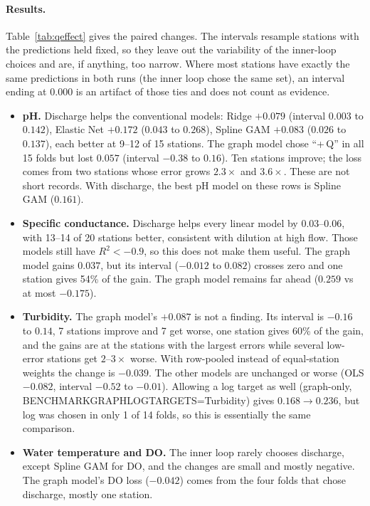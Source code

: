 \documentclass[11pt]{article}
\newcommand{\codeus}{\textunderscore\allowbreak}
\newcommand{\code}[1]{{\ttfamily\let\_\codeus #1}}
\begin{document}
\paragraph{Results.} Table~\ref{tab:qeffect} gives the paired changes. The intervals resample
stations with the predictions held fixed, so they leave out the variability of the inner-loop
choices and are, if anything, too narrow. Where most stations have exactly the same predictions in
both runs (the inner loop chose the same set), an interval ending at $0.000$ is an artifact of those
ties and does not count as evidence.
\begin{itemize}
  \item \textbf{pH.} Discharge helps the conventional models: Ridge $+0.079$ (interval $0.003$ to
        $0.142$), Elastic Net $+0.172$ ($0.043$ to $0.268$), Spline GAM $+0.083$ ($0.026$ to
        $0.137$), each better at 9--12 of 15 stations. The graph model chose ``+\,Q'' in all 15
        folds but lost $0.057$ (interval $-0.38$ to $0.16$). Ten stations improve; the loss comes
        from two stations whose error grows $2.3\times$ and $3.6\times$. These are not short
        records. With discharge, the best pH model on these rows is Spline GAM ($0.161$).
  \item \textbf{Specific conductance.} Discharge helps every linear model by $0.03$--$0.06$, with
        13--14 of 20 stations better, consistent with dilution at high flow. Those models still have
        $R^2<-0.9$, so this does not make them useful. The graph model gains $0.037$, but its
        interval ($-0.012$ to $0.082$) crosses zero and one station gives 54\% of the gain. The
        graph model remains far ahead ($0.259$ vs at most $-0.175$).
  \item \textbf{Turbidity.} The graph model's $+0.087$ is not a finding. Its interval is $-0.16$
        to $0.14$, 7 stations improve and 7 get worse, one station gives 60\% of the gain, and the
        gains are at the stations with the largest errors while several low-error stations get
        $2$--$3\times$ worse. With row-pooled instead of equal-station weights the change is
        $-0.039$. The other models are unchanged or worse (OLS $-0.082$, interval $-0.52$ to $-0.01$). Allowing a log target as well
        (graph-only, \code{BENCHMARK\_GRAPH\_LOG\_TARGETS=Turbidity}) gives $0.168\to0.236$, but
        log was chosen in only 1 of 14 folds, so this is essentially the same comparison.
  \item \textbf{Water temperature and DO.} The inner loop rarely chooses discharge, except
        Spline GAM for DO, and the changes are small and mostly negative. The graph model's DO
        loss ($-0.042$) comes from the four folds that chose discharge, mostly one station.
\end{itemize}
\end{document}
